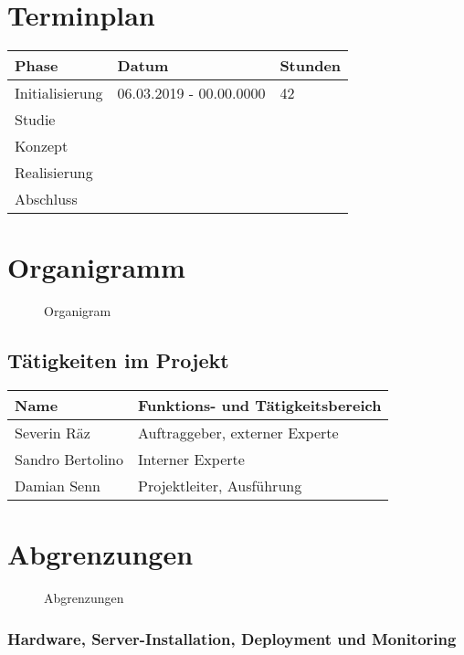 \section{Terminplan}\label{terminplan}

\begin{longtable}[]{@{}lll@{}}
\toprule
Phase & Datum & Stunden\tabularnewline
\midrule
\endhead
Initialisierung & 06.03.2019 - 00.00.0000 & 42\tabularnewline
Studie & &\tabularnewline
Konzept & &\tabularnewline
Realisierung & &\tabularnewline
Abschluss & &\tabularnewline
\bottomrule
\end{longtable}

\clearpage

\section{Organigramm}\label{organigramm}

\begin{figure}[!htb]
  \centering
  \def\svgwidth{\columnwidth}
  
  \caption{Organigram}
\end{figure}

\subsection{Tätigkeiten im Projekt}\label{tuxe4tigkeiten-im-projekt}

\begin{longtable}[]{@{}ll@{}}
\toprule
Name & Funktions- und Tätigkeitsbereich\tabularnewline
\midrule
\endhead
Severin Räz & Auftraggeber, externer Experte\tabularnewline
Sandro Bertolino & Interner Experte\tabularnewline
Damian Senn & Projektleiter, Ausführung\tabularnewline
\bottomrule
\end{longtable}

\clearpage

\section{Abgrenzungen}\label{abgrenzungen}

\begin{figure}[!htb]
  \centering
  \def\svgwidth{\columnwidth}
  
  \caption{Abgrenzungen}
\end{figure}

\subsubsection{Hardware, Server-Installation, Deployment und
Monitoring}\label{hardware-server-installation-deployment-und-monitoring}

